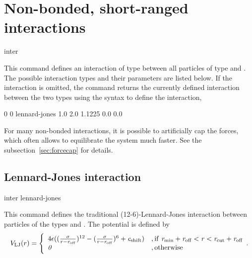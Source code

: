 \section{Non-bonded, short-ranged interactions}
\label{sec:inter-nb}

\begin{essyntax*}
  inter  
\end{essyntax*}
This command defines an interaction of type  between
all particles of type  and . The possible
interaction types and their parameters are listed below. If the
interaction is omitted, the command returns the currently defined
interaction between the two types using the syntax to define the
interaction, \eg
\begin{tclcode}
  0 0 lennard-jones 1.0 2.0 1.1225 0.0 0.0
\end{tclcode}

For many non-bonded interactions, it is possible to artificially cap
the forces, which often allows to equilibrate the system much
faster. See the subsection~\ref{sec:forcecap} for details.

\subsection{Lennard-Jones interaction}
\label{sec:LennardJones}

\begin{essyntax}
  inter  
  lennard-jones 
  \var{\epsilon} \var{\sigma} 
  \begin{features}
  \end{features}
\end{essyntax}

This command defines the traditional (12-6)-Lennard-Jones interaction
between particles of the types  and .  The
potential is defined by
\begin{equation}
  \label{eq:lj}
  V_\mathrm{LJ}(r) = \Biggl\{
    \begin{array}{ll}
      4\epsilon((\frac{\mathrm{\mathit{\sigma}}}{r-\mathrm{\mathit{r_\mathrm{off}}}})^{12}
      - (\frac{\mathrm{\mathit{\sigma}}}{r-\mathrm{\mathit{r_\mathrm{off}}}})^6+\mathrm{\mathit{c_\mathrm{shift}}}) 
      & \mathrm{, if~} \mathrm{\mathit{r_\mathrm{min}}}+\mathrm{\mathit{r_\mathrm{off}}} < \mathrm{\mathit{r}} < \mathrm{\mathit{r_\mathrm{cut}}}+\mathrm{\mathit{r_\mathrm{off}}}\\
      \mathit{0} 
      & \mathrm{, otherwise}\\
    \end{array}.
\end{equation}

